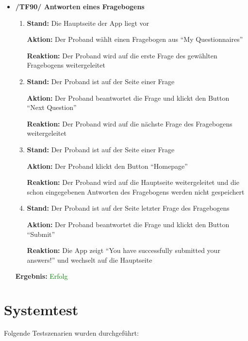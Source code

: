 \documentclass[a4paper]{scrreprt}
\begin{document}
\begin{itemize}
	        \item \textbf{/TF90/ Antworten eines Fragebogens}
	        \begin{enumerate}
	        	\item \par \textbf{Stand: }Die Hauptseite der App liegt vor
	        	\par \textbf{Aktion: }Der Proband wählt einen Fragebogen aus ``My Questionnaires''
	        	\par \textbf{Reaktion: }Der Proband wird auf die erste Frage des gewählten Fragebogens weitergeleitet
	        	\item \par \textbf{Stand: }Der Proband ist auf der Seite einer Frage
	        	\par \textbf{Aktion: }Der Proband beantwortet die Frage und klickt den Button ``Next Question''
	        	\par \textbf{Reaktion: }Der Proband wird auf die nächste Frage des Fragebogens weitergeleitet
	        	\item \par \textbf{Stand: }Der Proband ist auf der Seite einer Frage
	        	\par \textbf{Aktion: }Der Proband klickt den Button ``Homepage''
	        	\par \textbf{Reaktion: }Der Proband wird auf die Hauptseite weitergeleitet und die schon eingegebenen Antworten des Fragebogens werden nicht gespeichert
	        	\item \par \textbf{Stand: }Der Proband ist auf der Seite letzter Frage des Fragebogens
	        	\par \textbf{Aktion: }Der Proband beantwortet die Frage und klickt den Button ``Submit''
	        	\par \textbf{Reaktion: }Die App zeigt ``You have successfully submitted your answers!'' und wechselt auf die Hauptseite
	        \end{enumerate}
					\vspace*{0.3cm}
		           \par \textbf{Ergebnis: }\textcolor{green}{Erfolg}
		           \vspace*{0.6cm} 	        

            \end{itemize}	
	      
	  
	  \newpage
	  \chapter{Systemtest}         
	  Folgende Testszenarien wurden durchgef\"uhrt:
	  
\end{document}
